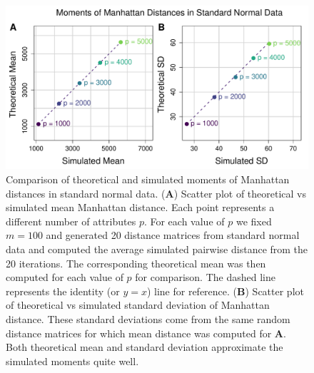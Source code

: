 \documentclass[10pt,letterpaper]{article}\usepackage[]{graphicx}\usepackage[]{color}
\begin{document}
\begin{figure}[H]
	\includegraphics[width=\textwidth]{compared_moments_normal_manhattan_standard.pdf}
	\caption{Comparison of theoretical and simulated moments of Manhattan distances in standard normal data. (\textbf{A}) Scatter plot of theoretical vs simulated mean Manhattan distance. Each point represents a different number of attributes $p$. For each value of $p$ we fixed $m=100$ and generated 20 distance matrices from standard normal data and computed the average simulated pairwise distance from the 20 iterations. The corresponding theoretical mean was then computed for each value of $p$ for comparison. The dashed line represents the identity (or $y=x$) line for reference. (\textbf{B}) Scatter plot of theoretical vs simulated standard deviation of Manhattan distance. These standard deviations come from the same random distance matrices for which mean distance was computed for \textbf{A}. Both theoretical mean and standard deviation approximate the simulated moments quite well.}
\end{figure}
\end{document}
